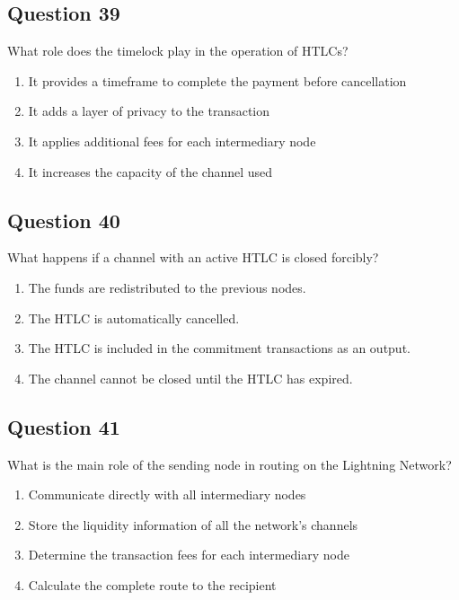 \documentclass[12pt,a4paper]{article}
\begin{document}
\bigskip


\subsection*{Question 39}
What role does the timelock play in the operation of HTLCs?

\begin{enumerate}[label=\Alph*., leftmargin=*]
\item It provides a timeframe to complete the payment before cancellation
\item It adds a layer of privacy to the transaction
\item It applies additional fees for each intermediary node
\item It increases the capacity of the channel used
\end{enumerate}

\bigskip


\subsection*{Question 40}
What happens if a channel with an active HTLC is closed forcibly?

\begin{enumerate}[label=\Alph*., leftmargin=*]
\item The funds are redistributed to the previous nodes.
\item The HTLC is automatically cancelled.
\item The HTLC is included in the commitment transactions as an output.
\item The channel cannot be closed until the HTLC has expired.
\end{enumerate}

\bigskip


\subsection*{Question 41}
What is the main role of the sending node in routing on the Lightning Network?

\begin{enumerate}[label=\Alph*., leftmargin=*]
\item Communicate directly with all intermediary nodes
\item Store the liquidity information of all the network's channels
\item Determine the transaction fees for each intermediary node
\item Calculate the complete route to the recipient
\end{enumerate}
\end{document}
